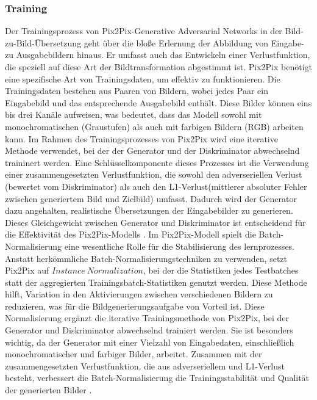 \subsubsection{Training}

Der Trainingsprozess von Pix2Pix-Generative Adversarial Networks in der Bild-zu-Bild-Übersetzung geht über die bloße Erlernung der Abbildung von Eingabe- zu Ausgabebildern hinaus. Er umfasst auch das Entwickeln einer Verlustfunktion, die speziell auf diese Art der Bildtransformation abgestimmt ist. Pix2Pix benötigt eine spezifische Art von Trainingsdaten, um effektiv zu funktionieren. Die Trainingsdaten bestehen aus Paaren von Bildern, wobei jedes Paar ein Eingabebild und das entsprechende Ausgabebild enthält. Diese Bilder können eins bis drei Kanäle aufweisen, was bedeutet, dass das Modell sowohl mit monochromatischen (Graustufen) als auch mit farbigen Bildern (RGB) arbeiten kann.
Im Rahmen des Trainingsprozesses von Pix2Pix wird eine iterative Methode verwendet, bei der der Generator und der Diskriminator abwechselnd traininert werden.
Eine Schlüsselkomponente dieses Prozesses ist die Verwendung einer zusammengesetzten Verlustfunktion, die sowohl den adverseriellen Verlust (bewertet vom Diskriminator) als auch den L1-Verlust(mittlerer absoluter Fehler zwischen generiertem Bild und Zielbild) umfasst. Dadurch wird der Generator dazu angehalten, realistische Übersetzungen der Eingabebilder zu generieren. Dieses Gleichgewicht zwischen Generator und Diskriminator ist entscheidend für die Effektivität des Pix2Pix-Modells \cite{HazemAbdelmotaalAhmedA.AbdouAhmedF.OmarDaliaMohamedElSebaityKhaledAbdelazeem.2021}.\newline
Im Pix2Pix-Modell spielt die Batch-Normalisierung eine wesentliche Rolle für die Stabilisierung des lernprozesses. Anstatt herkömmliche Batch-Normalisierungstechniken zu verwenden, setzt Pix2Pix auf $Instance\ Normalization$, bei der die Statistiken jedes Testbatches statt der aggregierten Trainingsbatch-Statistiken genutzt werden. Diese Methode hilft, Variation in den Aktivierungen zwischen verschiedenen Bildern zu reduzieren, was für die Bildgenerierungsaufgabe von Vorteil ist. \newline
Diese Normalisierung ergänzt die iterative Trainingsmethode von Pix2Pix, bei der Generator und Diskriminator abwechselnd trainiert werden. Sie ist besonders wichtig, da der Generator mit einer Vielzahl von Eingabedaten, einschließlich monochromatischer und farbiger Bilder, arbeitet. Zusammen mit der zusammengesetzten Verlustfunktion, die aus adverseriellem und L1-Verlust besteht, verbessert die Batch-Normalisierung die Trainingsstabilität und Qualität der generierten Bilder \cite{PhillipIsola.}. 
  

